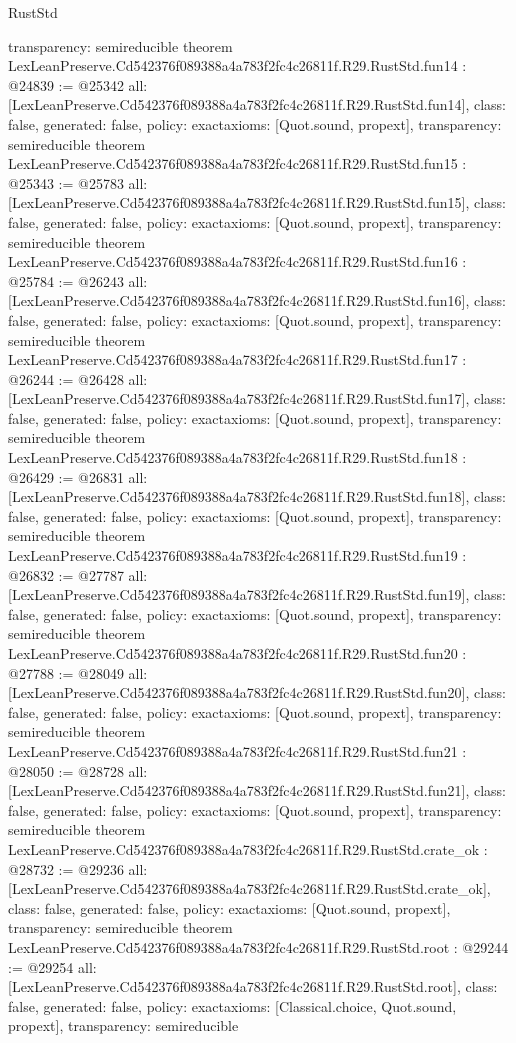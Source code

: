 \begin{lexlean}{RustStd}
\begin{coremodule}
{  transparency: semireducible
}
theorem LexLeanPreserve.Cd542376f089388a4a783f2fc4c26811f.R29.RustStd.fun14 : @24839 := @25342 {
  all: [LexLeanPreserve.Cd542376f089388a4a783f2fc4c26811f.R29.RustStd.fun14],
  class: false,
  generated: false,
  policy: exact{axioms: [Quot.sound, propext]},
  transparency: semireducible
}
theorem LexLeanPreserve.Cd542376f089388a4a783f2fc4c26811f.R29.RustStd.fun15 : @25343 := @25783 {
  all: [LexLeanPreserve.Cd542376f089388a4a783f2fc4c26811f.R29.RustStd.fun15],
  class: false,
  generated: false,
  policy: exact{axioms: [Quot.sound, propext]},
  transparency: semireducible
}
theorem LexLeanPreserve.Cd542376f089388a4a783f2fc4c26811f.R29.RustStd.fun16 : @25784 := @26243 {
  all: [LexLeanPreserve.Cd542376f089388a4a783f2fc4c26811f.R29.RustStd.fun16],
  class: false,
  generated: false,
  policy: exact{axioms: [Quot.sound, propext]},
  transparency: semireducible
}
theorem LexLeanPreserve.Cd542376f089388a4a783f2fc4c26811f.R29.RustStd.fun17 : @26244 := @26428 {
  all: [LexLeanPreserve.Cd542376f089388a4a783f2fc4c26811f.R29.RustStd.fun17],
  class: false,
  generated: false,
  policy: exact{axioms: [Quot.sound, propext]},
  transparency: semireducible
}
theorem LexLeanPreserve.Cd542376f089388a4a783f2fc4c26811f.R29.RustStd.fun18 : @26429 := @26831 {
  all: [LexLeanPreserve.Cd542376f089388a4a783f2fc4c26811f.R29.RustStd.fun18],
  class: false,
  generated: false,
  policy: exact{axioms: [Quot.sound, propext]},
  transparency: semireducible
}
theorem LexLeanPreserve.Cd542376f089388a4a783f2fc4c26811f.R29.RustStd.fun19 : @26832 := @27787 {
  all: [LexLeanPreserve.Cd542376f089388a4a783f2fc4c26811f.R29.RustStd.fun19],
  class: false,
  generated: false,
  policy: exact{axioms: [Quot.sound, propext]},
  transparency: semireducible
}
theorem LexLeanPreserve.Cd542376f089388a4a783f2fc4c26811f.R29.RustStd.fun20 : @27788 := @28049 {
  all: [LexLeanPreserve.Cd542376f089388a4a783f2fc4c26811f.R29.RustStd.fun20],
  class: false,
  generated: false,
  policy: exact{axioms: [Quot.sound, propext]},
  transparency: semireducible
}
theorem LexLeanPreserve.Cd542376f089388a4a783f2fc4c26811f.R29.RustStd.fun21 : @28050 := @28728 {
  all: [LexLeanPreserve.Cd542376f089388a4a783f2fc4c26811f.R29.RustStd.fun21],
  class: false,
  generated: false,
  policy: exact{axioms: [Quot.sound, propext]},
  transparency: semireducible
}
theorem LexLeanPreserve.Cd542376f089388a4a783f2fc4c26811f.R29.RustStd.crate_ok : @28732 := @29236 {
  all: [LexLeanPreserve.Cd542376f089388a4a783f2fc4c26811f.R29.RustStd.crate_ok],
  class: false,
  generated: false,
  policy: exact{axioms: [Quot.sound, propext]},
  transparency: semireducible
}
theorem LexLeanPreserve.Cd542376f089388a4a783f2fc4c26811f.R29.RustStd.root : @29244 := @29254 {
  all: [LexLeanPreserve.Cd542376f089388a4a783f2fc4c26811f.R29.RustStd.root],
  class: false,
  generated: false,
  policy: exact{axioms: [Classical.choice, Quot.sound, propext]},
  transparency: semireducible
}


\end{coremodule}
\end{lexlean}
